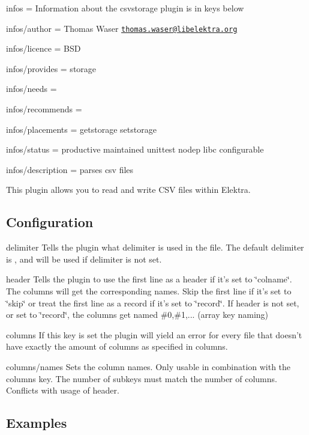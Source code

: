 
\begin{DoxyItemize}
\item infos = Information about the csvstorage plugin is in keys below
\item infos/author = Thomas Waser \href{mailto:thomas.waser@libelektra.org}{\tt thomas.\+waser@libelektra.\+org}
\item infos/licence = B\+S\+D
\item infos/provides = storage
\item infos/needs =
\item infos/recommends =
\item infos/placements = getstorage setstorage
\item infos/status = productive maintained unittest nodep libc configurable
\item infos/description = parses csv files
\end{DoxyItemize}

This plugin allows you to read and write C\+S\+V files within Elektra.

\subsection*{Configuration}

{\ttfamily delimiter} Tells the plugin what delimiter is used in the file. The default delimiter is {\ttfamily ,} and will be used if {\ttfamily delimiter} is not set.

{\ttfamily header} Tells the plugin to use the first line as a header if it's set to \char`\"{}colname\char`\"{}. The columns will get the corresponding names. Skip the first line if it's set to \char`\"{}skip\char`\"{} or treat the first line as a record if it's set to \char`\"{}record\char`\"{}. If {\ttfamily header} is not set, or set to \char`\"{}record\char`\"{}, the columns get named \#0,\#1,... (array key naming)

{\ttfamily columns} If this key is set the plugin will yield an error for every file that doesn't have exactly the amount of columns as specified in {\ttfamily columns}.

{\ttfamily columns/names} Sets the column names. Only usable in combination with the {\ttfamily columns} key. The number of subkeys must match the number of columns. Conflicts with usage of {\ttfamily header}.

\subsection*{Examples}

